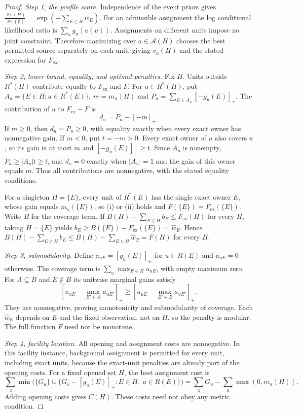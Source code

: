 \documentclass[10pt]{article}
\theoremstyle{plain}
\theoremstyle{remark}
\begin{document}
\begin{proof}
\emph{Step 1, the profile score.} Independence of the event priors gives $\tfrac{\Pr(H)}{\Pr(\emptyset)}=\exp(-\sum_{E\in H}w_E)$. For an admissible assignment the log conditional likelihood ratio is $\sum_u g_u(a(u))$. Assignments on different units impose no joint constraint. Therefore maximizing over $a\in\mathcal A(H)$ chooses the best permitted source separately on each unit, giving $v_u(H)$ and the stated expression for $F_{\mathrm{ex}}$.

\emph{Step 2, lower bound, equality, and optimal penalties.} Fix $H$. Units outside $R^*(H)$ contribute equally to $F_{\mathrm{ex}}$ and $F$. For $u\in R^*(H)$, put $A_u=\{E\in H:u\in R^*(E)\}$, $m=m_u(H)$ and $P_u=\sum_{E\in A_u}[-g_u(E)]_+$. The contribution of $u$ to $F_{\mathrm{ex}}-F$ is
\[
d_u=P_u-[-m]_+.
\]
If $m\ge0$, then $d_u=P_u\ge0$, with equality exactly when every exact owner has nonnegative gain. If $m<0$, put $t=-m>0$. Every exact owner of $u$ also covers $u$, so its gain is at most $m$ and $[-g_u(E)]_+\ge t$. Since $A_u$ is nonempty, $P_u\ge |A_u|t\ge t$, and $d_u=0$ exactly when $|A_u|=1$ and the gain of this owner equals $m$. Thus all contributions are nonnegative, with the stated equality conditions.

For a singleton $H=\{E\}$, every unit of $R^*(E)$ has the single exact owner $E$, whose gain equals $m_u(\{E\})$, so (i) or (ii) holds and $F(\{E\})=F_{\mathrm{ex}}(\{E\})$. Write $B$ for the coverage term. If $B(H)-\sum_{E\in H}b_E\le F_{\mathrm{ex}}(H)$ for every $H$, taking $H=\{E\}$ yields $b_E\ge B(\{E\})-F_{\mathrm{ex}}(\{E\})=\hat w_E$. Hence $B(H)-\sum_{E\in H}b_E\le B(H)-\sum_{E\in H}\hat w_E=F(H)$ for every $H$.

\emph{Step 3, submodularity.} Define $a_{uE}=[g_u(E)]_+$ for $u\in R(E)$ and $a_{uE}=0$ otherwise. The coverage term is $\sum_u\max_{E\in H}a_{uE}$, with empty maximum zero. For $A\subseteq B$ and $E\notin B$ its unitwise marginal gains satisfy
\[
\left[a_{uE}-\max_{E'\in A}a_{uE'}\right]_+
\ge
\left[a_{uE}-\max_{E'\in B}a_{uE'}\right]_+.
\]
They are nonnegative, proving monotonicity and submodularity of coverage. Each $\hat w_E$ depends on $E$ and the fixed observation, not on $H$, so the penalty is modular. The full function $F$ need not be monotone.

\emph{Step 4, facility location.} All opening and assignment costs are nonnegative. In this facility instance, background assignment is permitted for every unit, including exact units, because the exact-unit penalties are already part of the opening costs. For a fixed opened set $H$, the best assignment cost is
\[
\sum_u\min\bigl(\{G_u\}\cup\{G_u-[g_u(E)]_+:E\in H,\ u\in R(E)\}\bigr)
=\sum_uG_u-\sum_u\max(0,m_u(H)).
\]
Adding opening costs gives $C(H)$. These costs need not obey any metric condition.


\end{proof}
\end{document}
